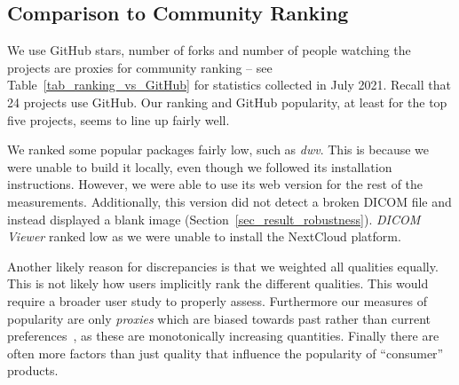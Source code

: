 \documentclass[final, 12pt, 3p, times]{elsarticle}
\begin{document}
\subsection{Comparison to Community Ranking} \label{Sec_VsCommunityRanking}

We use GitHub stars, number of forks and number of people watching the projects
are proxies for community ranking -- see Table~\ref{tab_ranking_vs_GitHub}
for statistics collected in July 2021.  Recall that 24 projects use GitHub.
Our ranking and GitHub popularity, at least for the top five projects,
seems to line up fairly well.

We ranked some popular packages fairly low, such as \textit{dwv}. This is
because we were unable to build it locally, even though we followed its
installation instructions. However, we were able to use its web
version for the rest of the measurements. Additionally, this version 
did not detect a broken DICOM file and instead displayed a blank image
(Section~\ref{sec_result_robustness}).
\textit{DICOM Viewer} ranked low as we were unable to install the
NextCloud platform.

Another likely reason for discrepancies is that we weighted all qualities
equally. This is not likely how users implicitly rank the different qualities.
This would require a broader user study to properly assess. Furthermore our
measures of popularity are only \emph{proxies} which are biased towards
past rather than current preferences~\cite{Szulik2017}, as these are
monotonically increasing quantities. Finally there are often more factors than
just quality that influence the popularity of ``consumer'' products.
\end{document}
